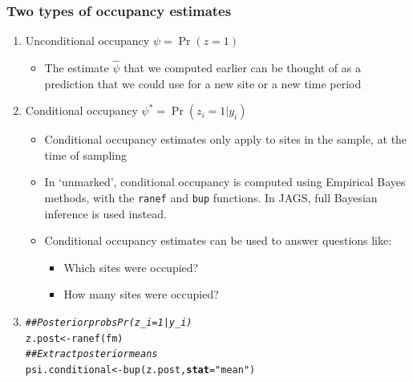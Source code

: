 \documentclass[color=usenames,dvipsnames]{beamer}\usepackage[]{graphicx}\usepackage[]{xcolor}
\makeatletter
\newcommand{\hlsng}[1]{\textcolor[rgb]{0.749,0.012,0.012}{#1}}%
\newcommand{\hlcom}[1]{\textcolor[rgb]{0.514,0.506,0.514}{\textit{#1}}}%
\newcommand{\hldef}[1]{\textcolor[rgb]{0,0,0}{#1}}%
\newcommand{\hlkwb}[1]{\textcolor[rgb]{0,0.341,0.682}{#1}}%
\newcommand{\hlkwc}[1]{\textcolor[rgb]{0,0,0}{\textbf{#1}}}%
\newcommand{\hlkwd}[1]{\textcolor[rgb]{0.004,0.004,0.506}{#1}}%
\newenvironment{kframe}{%
 \def\at@end@of@kframe{}%
 \ifinner\ifhmode%
  \def\at@end@of@kframe{\end{minipage}}%
  \begin{minipage}{\columnwidth}%
 \fi\fi%
 \def\FrameCommand##1{\hskip\@totalleftmargin \hskip-\fboxsep
 \colorbox{shadecolor}{##1}\hskip-\fboxsep
     \hskip-\linewidth \hskip-\@totalleftmargin \hskip\columnwidth}%
 \MakeFramed {\advance\hsize-\width
   \@totalleftmargin\z@ \linewidth\hsize
   \@setminipage}}%
 {\par\unskip\endMakeFramed%
 \at@end@of@kframe}
\newenvironment{knitrout}{}{} %
\newcommand{\inr}[1]{\colorbox{inlinecolor}{\texttt{#1}}}
\makeatother
\begin{document}
\begin{frame}[fragile]
  \frametitle{Two types of occupancy estimates}
  \begin{enumerate}%
  \item<1-> Unconditional occupancy $\psi=\Pr(z=1)$
    \begin{itemize}
      \item<1-> The estimate $\hat{\psi}$ that we computed earlier can be
        thought of as a prediction that we could use for a new
        site or a new time period
    \end{itemize}
  \item<2-> Conditional occupancy $\psi^* = \Pr(z_i=1|y_{i})$
    \begin{itemize}
      \item<2-> Conditional occupancy estimates only apply to sites in the
        sample, at the time of sampling
      \item<3-> In `unmarked', conditional occupancy is computed using
        Empirical Bayes methods, with the \inr{ranef} and \inr{bup}
        functions. In JAGS, full Bayesian inference is used instead. %
      \item<4-> Conditional occupancy estimates can be used to answer
        questions like: 
        \begin{itemize}
          \item Which sites were occupied?
          \item How many sites were occupied?
        \end{itemize}
    \end{itemize}
  \item<5->[]  
\begin{knitrout}\scriptsize
{}\color{fgcolor}\begin{kframe}
\begin{alltt}
\hlcom{## Posterior probs Pr(z_i=1 | y_i)       }
\hldef{z.post} \hlkwb{<-} \hlkwd{ranef}\hldef{(fm)}
\hlcom{## Extract posterior means}
\hldef{psi.conditional} \hlkwb{<-}  \hlkwd{bup}\hldef{(z.post,} \hlkwc{stat}\hldef{=}\hlsng{"mean"}\hldef{)}
\end{alltt}
\end{kframe}
\end{knitrout}
  \end{enumerate}
\end{frame}
\end{document}
